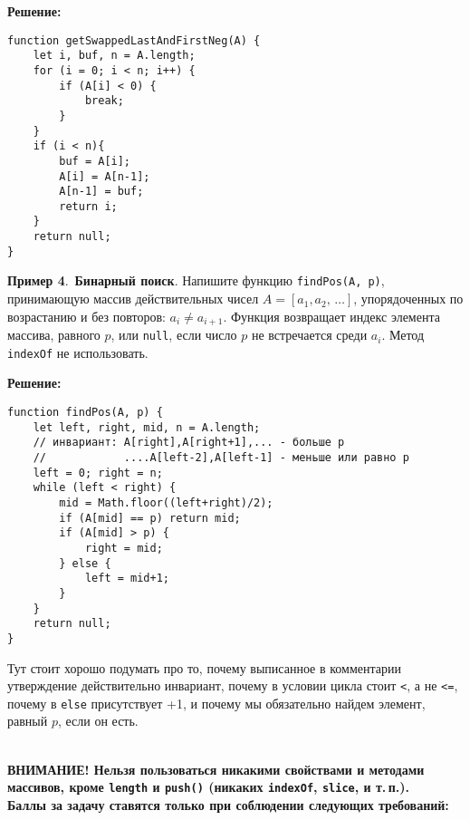 \documentclass{article}
\begin{document}
\smallskip\noindent\textbf{Решение:}
\begin{verbatim}
function getSwappedLastAndFirstNeg(A) {
    let i, buf, n = A.length;
    for (i = 0; i < n; i++) {
        if (A[i] < 0) {
            break;
        }
    }
    if (i < n){
        buf = A[i];
        A[i] = A[n-1];
        A[n-1] = buf;
        return i;
    } 
    return null;
}
\end{verbatim}


{\bf Пример 4}.~{\bf Бинарный поиск}. Напишите функцию \texttt{findPos(A, p)}, принимающую массив действительных чисел $A = [a_1, a_2, \, \ldots]$, упорядоченных по возрастанию и без повторов: $a_i \neq a_{i+1}$. Функция возвращает индекс элемента массива, равного $p$, или \texttt{null}, если число $p$ не встречается среди $a_i$. Метод \texttt{indexOf} не использовать.

\pagebreak[4]
\noindent
\medskip\noindent\textbf{Решение:}
\begin{verbatim}
function findPos(A, p) {
    let left, right, mid, n = A.length;
    // инвариант: A[right],A[right+1],... - больше p
    //            ....A[left-2],A[left-1] - меньше или равно p
    left = 0; right = n;
    while (left < right) {
        mid = Math.floor((left+right)/2);
        if (A[mid] == p) return mid;
        if (A[mid] > p) {
            right = mid;
        } else {
            left = mid+1;
        }
    }
    return null;
}
\end{verbatim}
Тут стоит хорошо подумать про то, почему выписанное в комментарии утверждение действительно инвариант, почему в условии цикла стоит \texttt{<}, а не \texttt{<=},
почему в \texttt{else} присутствует +1, и почему мы обязательно найдем элемент, равный $p$, если он есть. 

\newpage

\noindent
{
    \color{red}
    \bf
    \\[1.5mm]
    ВНИМАНИЕ! Нельзя пользоваться никакими свойствами и методами массивов, кроме \texttt{length} и \texttt{push()} (никаких \texttt{indexOf}, \texttt{slice}, и т.\,п.).
    \\[1.5mm]
    Баллы за задачу ставятся только при соблюдении следующих требований:
}

\medskip
\end{document}
